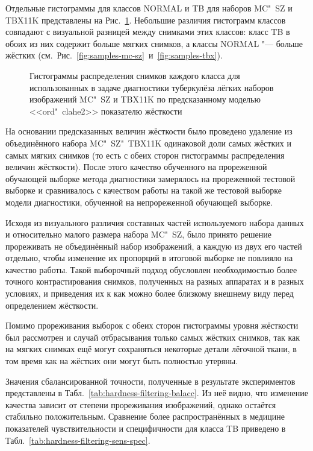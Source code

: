 Отдельные гистограммы для классов NORMAL и TB для наборов MC"~SZ и TBX11K представлены на Рис.~\ref{fig:ordinal-hist-datasetwise}. Небольшие различия гистограмм классов совпадают с визуальной разницей между снимками этих классов: класс TB в обоих из них содержит больше мягких снимков, а классы NORMAL "--- больше жёстких (см.~Рис.~\ref{fig:samples-mc-sz}~и~\ref{fig:samples-tbx}).

\begin{figure}[ht]
	\caption{Гистограммы распределения снимков каждого класса для использованных в задаче диагностики туберкулёза лёгких наборов изображений MC"~SZ и TBX11K по предсказанному моделью <<ord"~clahe2>> показателю жёсткости}
	\label{fig:ordinal-hist-datasetwise}
\end{figure}

На основании предсказанных величин жёсткости было проведено удаление из объединённого набора MC"~SZ"~TBX11K одинаковой доли самых жёстких и самых мягких снимков (то есть с обеих сторон гистограммы распределения величин жёсткости). После этого качество обученного на прореженной обучающей выборке метода диагностики замерялось на прореженной тестовой выборке и сравнивалось с качеством работы на такой же тестовой выборке модели диагностики, обученной на непрореженной обучающей выборке.

Исходя из визуального различия составных частей используемого набора данных и относительно малого размера набора MC"~SZ, было принято решение прореживать не объединённый набор изображений, а каждую из двух его частей отдельно, чтобы изменение их пропорций в итоговой выборке не повлияло на качество работы. Такой выборочный подход обусловлен необходимостью более точного контрастирования снимков, полученных на разных аппаратах и в разных условиях, и приведения их к как можно более близкому внешнему виду перед определением жёсткости.

Помимо прореживания выборок с обеих сторон гистограммы уровня жёсткости был рассмотрен и случай отбрасывания только самых жёстких снимков, так как на мягких снимках ещё могут сохраняться некоторые детали лёгочной ткани, в том время как на жёстких они могут быть полностью утеряны.

Значения сбалансированной точности, полученные в результате экспериментов представлены в Табл.~\ref{tab:hardness-filtering-balacc}. Из неё видно, что изменение качества зависит от степени прореживания изображений, однако остаётся стабильно положительным. Сравнение более распространённых в медицине показателей чувствительности и специфичности для класса TB приведено в Табл.~\ref{tab:hardness-filtering-sens-spec}.

